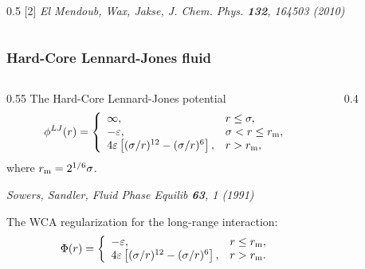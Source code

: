 \documentclass[8pt]{beamer}
\begin{document}
\begin{frame}
\begin{columns}
\begin{column}{0.5\textwidth}
				[2] \textit{El Mendoub, Wax, Jakse, J. Chem. Phys. \textbf{132}, 164503 (2010)}
			\end{column}
						
		\end{columns}
						
	\end{frame}
	
	\begin{frame}
		\frametitle{Hard-Core Lennard-Jones fluid}
		
		\begin{columns}
			\begin{column}{0.55\textwidth}
				The Hard-Core Lennard-Jones potential
				\begin{equation*}
					\phi^{LJ}(r) = \left\{
					\begin{array}{llll}
						\infty, & r\leq \sigma,
						\\
						-\varepsilon, & \sigma < r \leq r_{\rm m}, 
						\\
						4\varepsilon \left[(\sigma/r)^{12} - (\sigma/r)^6\right], & r > r_{\rm m},
					\end{array}
					\right.
				\end{equation*}
				where $r_{\rm m}=2^{1/6}\sigma$.
				
				\textit{Sowers, Sandler, Fluid Phase Equilib \textbf{63}, 1 (1991)}
				\hfill
				\\
				\hfill
				
				The WCA regularization for the long-range interaction:
				\begin{equation*}
					\Phi(r) = \left\{
					\begin{array}{ll}
						-\varepsilon, & r \leq r_{\rm m},
						\\
						4\varepsilon \left[(\sigma/r)^{12} - (\sigma/r)^6\right], & r > r_{\rm m}.
					\end{array}	
					\right.
				\end{equation*}
			\end{column}
			
			\begin{column}{0.4\textwidth}
				

\end{column}
\end{columns}
\end{frame}
\end{document}
